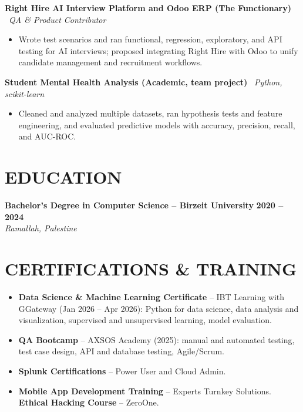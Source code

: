 \documentclass[10pt]{article}
\newcommand{\role}[3]{\textbf{#1} \hfill \textbf{#3}\\{\small\itshape #2}\par}
\newcommand{\project}[2]{\textbf{#1} \textbar\ {\small\itshape #2}\par}
\begin{document}
\project{Right Hire AI Interview Platform and Odoo ERP (The Functionary)}{QA \& Product Contributor}
\begin{itemize}
\item Wrote test scenarios and ran functional, regression, exploratory, and API testing for AI interviews; proposed integrating Right Hire with Odoo to unify candidate management and recruitment workflows.
\end{itemize}
\project{Student Mental Health Analysis (Academic, team project)}{Python, scikit-learn}
\begin{itemize}
\item Cleaned and analyzed multiple datasets, ran hypothesis tests and feature engineering, and evaluated predictive models with accuracy, precision, recall, and AUC-ROC.
\end{itemize}

\section{EDUCATION}
\role{Bachelor's Degree in Computer Science -- Birzeit University}{Ramallah, Palestine}{2020 -- 2024}

\section{CERTIFICATIONS \& TRAINING}
\begin{itemize}
\item \textbf{Data Science \& Machine Learning Certificate} -- IBT Learning with GGateway (Jan 2026 -- Apr 2026): Python for data science, data analysis and visualization, supervised and unsupervised learning, model evaluation.
\item \textbf{QA Bootcamp} -- AXSOS Academy (2025): manual and automated testing, test case design, API and database testing, Agile/Scrum.
\item \textbf{Splunk Certifications} -- Power User and Cloud Admin.
\item \textbf{Mobile App Development Training} -- Experts Turnkey Solutions. \textbf{Ethical Hacking Course} -- ZeroOne.
\end{itemize}
\end{document}
